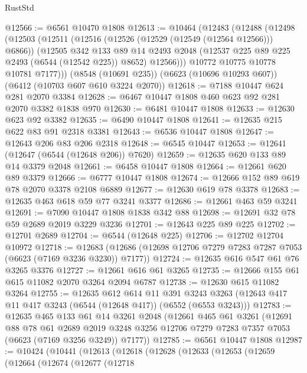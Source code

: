 \begin{lexlean}{RustStd}
\begin{coremodule}
@12566 := @6561 @10470 @1808
@12613 := @10464
    (@12483
      (@12488
        (@12498
          (@12503
            (@12511
              (@12516 (@12526 (@12529 (@12549 (@12564 @12566))) @6866))
              (@12505
                @342
                @133
                @89
                @14
                @2493
                @2048
                (@12537 @225 @89 @225 @2493 (@6544 (@12542 @225)) @8652)
                @12566)))
          @10772
          @10775
          @10778
          @10781
          @7177)))
    (@8548 (@10691 @235))
    (@6623 (@10696 @10293 @607))
    (@6412 (@10703 @607 @610 @3224 @2070))
@12618 := @7188 @10447 @624 @281 @2070 @3384
@12628 := @6467 @10447 @1808 @460 @623 @92 @281 @2070 @3382 @1838 @970
@12630 := @6481 @10447 @1808
@12633 := @12630 @623 @92 @3382
@12635 := @6490 @10447 @1808
@12641 := @12635 @215 @622 @83 @91 @2318 @3381
@12643 := @6536 @10447 @1808
@12647 := @12643 @206 @83 @206 @2318
@12648 := @6545 @10447
@12653 := @12641 (@12647 (@6544 (@12648 @206)) @7620)
@12659 := @12635 @620 @133 @89 @14 @3379 @2048
@12661 := @6458 @10447 @1808
@12664 := @12661 @620 @89 @3379
@12666 := @6777 @10447 @1808
@12674 := @12666 @152 @89 @619 @78 @2070 @3378 @2108 @6889
@12677 := @12630 @619 @78 @3378
@12683 := @12635 @463 @618 @59 @77 @3241 @3377
@12686 := @12661 @463 @59 @3241
@12691 := @7090 @10447 @1808 @1838 @342 @88
@12698 := @12691 @32 @78 @59 @2689 @2019 @3229 @3236
@12701 := @12643 @225 @89 @225
@12702 := @12701 @2689
@12704 := @6544 (@12648 @225)
@12706 := @12702 @12704 @10972
@12718 := @12683 (@12686 (@12698 @12706 @7279 @7283 @7287 @7053 (@6623 (@7169 @3236 @3230)) @7177))
@12724 := @12635 @616 @547 @61 @76 @3265 @3376
@12727 := @12661 @616 @61 @3265
@12735 := @12666 @155 @61 @615 @11082 @2070 @3264 @2094 @6787
@12738 := @12630 @615 @11082 @3264
@12755 := @12635
    @612
    @614
    @11
    @391
    @3243
    @3263
    (@12643 @417 @11 @417 @3243 (@6544 (@12648 @417)) (@6552 (@6553 @3243)))
@12783 := @12635
    @465
    @133
    @61
    @14
    @3261
    @2048
    (@12661
      @465
      @61
      @3261
      (@12691
        @88
        @78
        @61
        @2689
        @2019
        @3248
        @3256
        @12706
        @7279
        @7283
        @7357
        @7053
        (@6623 (@7169 @3256 @3249))
        @7177))
@12785 := @6561 @10447 @1808
@12987 := @10424
    (@10441
      (@12613
        (@12618
          (@12628
            (@12633
              (@12653
                (@12659
                  (@12664
                    (@12674
                      (@12677
                        (@12718

\end{coremodule}
\end{lexlean}
